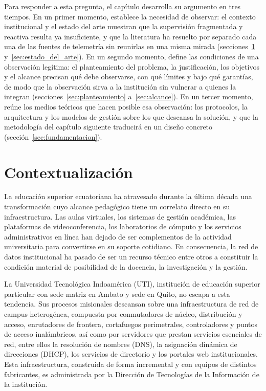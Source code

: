 Para responder a esta pregunta, el capítulo desarrolla su argumento en tres tiempos. En un primer momento, establece la necesidad de observar: el contexto institucional y el estado del arte muestran que la supervisión fragmentada y reactiva resulta ya insuficiente, y que la literatura ha resuelto por separado cada una de las fuentes de telemetría sin reunirlas en una misma mirada (secciones~\ref{sec:contextualizacion} y~\ref{sec:estado_del_arte}). En un segundo momento, define las condiciones de una observación legítima: el planteamiento del problema, la justificación, los objetivos y el alcance precisan qué debe observarse, con qué límites y bajo qué garantías, de modo que la observación sirva a la institución sin vulnerar a quienes la integran (secciones~\ref{sec:planteamiento} a~\ref{sec:alcance}). En un tercer momento, reúne los medios teóricos que hacen posible esa observación: los protocolos, la arquitectura y los modelos de gestión sobre los que descansa la solución, y que la metodología del capítulo siguiente traducirá en un diseño concreto (sección~\ref{sec:fundamentacion}).

\section{Contextualización}
\label{sec:contextualizacion}

La educación superior ecuatoriana ha atravesado durante la última década una transformación cuyo alcance pedagógico tiene un correlato directo en su infraestructura. Las aulas virtuales, los sistemas de gestión académica, las plataformas de videoconferencia, los laboratorios de cómputo y los servicios administrativos en línea han dejado de ser complementos de la actividad universitaria para convertirse en su soporte cotidiano. En consecuencia, la red de datos institucional ha pasado de ser un recurso técnico entre otros a constituir la condición material de posibilidad de la docencia, la investigación y la gestión.

La Universidad Tecnológica Indoamérica (UTI), institución de educación superior particular con sede matriz en Ambato y sede en Quito, no escapa a esta tendencia. Sus procesos misionales descansan sobre una infraestructura de red de campus heterogénea, compuesta por conmutadores de núcleo, distribución y acceso, enrutadores de frontera, cortafuegos perimetrales, controladores y puntos de acceso inalámbricos, así como por servidores que prestan servicios esenciales de red, entre ellos la resolución de nombres (DNS), la asignación dinámica de direcciones (DHCP), los servicios de directorio y los portales web institucionales. Esta infraestructura, construida de forma incremental y con equipos de distintos fabricantes, es administrada por la Dirección de Tecnologías de la Información de la institución.

